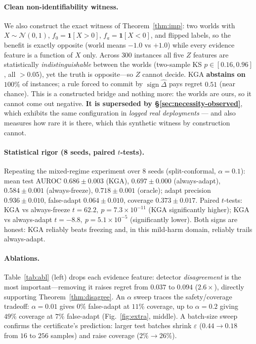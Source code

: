\documentclass[conference]{IEEEtran}
\theoremstyle{plain}
\theoremstyle{definition}
\newcommand{\sign}{\operatorname{sign}}
\begin{document}
\paragraph{Clean non-identifiability witness.} We also construct the exact witness of
Theorem~\ref{thm:imp}: two worlds with $X\sim\mathcal N(0,1)$, $f_0=\mathbf1[X{>}0]$,
$f_a=\mathbf1[X{<}0]$, and flipped labels, so the benefit is exactly opposite
(world means $-1.0$ vs $+1.0$) while every evidence feature is a function of $X$ only.
Across $300$ instances all five $Z$ features are statistically \emph{indistinguishable}
between the worlds (two-sample KS $p\in[0.16,0.96]$, all $>0.05$), yet the truth is
opposite---so $Z$ cannot decide. \textsc{KGA} \textbf{abstains on $100\%$} of instances;
a rule forced to commit by $\sign\widehat\Delta$ pays regret $0.51$ (near chance). This is a
constructed bridge and nothing more: the worlds are ours, so it cannot come out negative.
\textbf{It is superseded by \S\ref{sec:necessity-observed}}, which exhibits the same configuration
in \emph{logged real deployments} --- and also measures how rare it is there, which this synthetic
witness by construction cannot.

\paragraph{Statistical rigor (8 seeds, paired $t$-tests).} Repeating the mixed-regime
experiment over 8 seeds (split-conformal, $\alpha{=}0.1$): mean test AUROC
$0.686\pm0.003$ (\textsc{KGA}), $0.697\pm0.000$ (always-adapt), $0.584\pm0.001$
(always-freeze), $0.718\pm0.001$ (oracle); adapt precision $0.936\pm0.010$, false-adapt
$0.064\pm0.010$, coverage $0.373\pm0.017$. Paired $t$-tests: \textsc{KGA} vs
always-freeze $t{=}62.2,\ p{=}7.3\times10^{-11}$ (\textsc{KGA} significantly higher);
\textsc{KGA} vs always-adapt $t{=}-8.8,\ p{=}5.1\times10^{-5}$ (significantly lower).
Both signs are honest: \textsc{KGA} reliably beats freezing and, in this mild-harm
domain, reliably trails always-adapt.

\paragraph{Ablations.} Table~\ref{tab:abl} (left) drops each evidence feature: detector
\emph{disagreement} is the most important---removing it raises regret from $0.037$ to
$0.094$ ($2.6\times$), directly supporting Theorem~\ref{thm:disagree}. An $\alpha$ sweep
traces the safety/coverage tradeoff: $\alpha{=}0.01$ gives $0\%$ false-adapt at $11\%$
coverage, up to $\alpha{=}0.2$ giving $49\%$ coverage at $7\%$ false-adapt
(Fig.~\ref{fig:extra}, middle). A batch-size sweep confirms the certificate's
prediction: larger test batches shrink $\varepsilon$ ($0.44\!\to\!0.18$ from $16$ to
$256$ samples) and raise coverage ($2\%\!\to\!26\%$).
\end{document}

